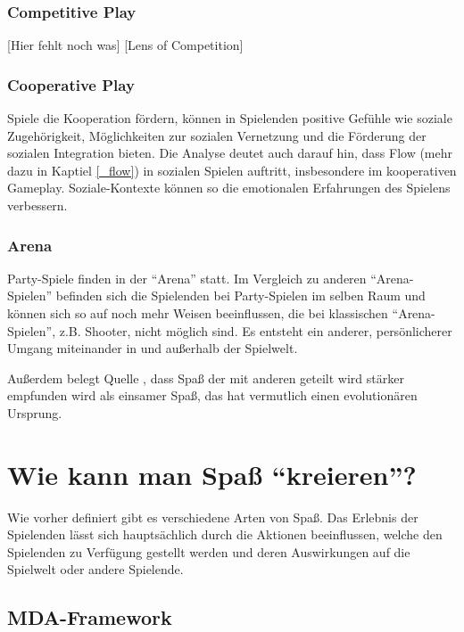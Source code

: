 \subsubsection{Competitive Play}
[Hier fehlt noch was]
[Lens of Competition]

\subsubsection{Cooperative Play\label{_cooperative_play}}
Spiele die Kooperation fördern, können in Spielenden positive Gefühle wie soziale Zugehörigkeit, Möglichkeiten zur sozialen Vernetzung und die Förderung der sozialen Integration bieten\cite{_putting_the_fun_factor_into_gaming}. Die Analyse deutet auch darauf hin, dass Flow (mehr dazu in Kaptiel \ref{_flow}) in sozialen Spielen auftritt, insbesondere im kooperativen Gameplay\cite{_putting_the_fun_factor_into_gaming}. Soziale-Kontexte können so die emotionalen Erfahrungen des Spielens verbessern.

\subsubsection{Arena}
Party-Spiele finden in der "`Arena"' statt\cite[S. 65]{_art_of_gamedesign}. Im Vergleich zu anderen "`Arena-Spielen"' befinden sich die Spielenden bei Party-Spielen im selben Raum und können sich so auf noch mehr Weisen beeinflussen, die bei klassischen "`Arena-Spielen"', z.B. Shooter, nicht möglich sind. Es entsteht ein anderer, persönlicherer Umgang miteinander in und außerhalb der Spielwelt.\newline

\noindent Außerdem belegt Quelle \cite{_fun_is_more_fun}, dass Spaß der mit anderen geteilt wird stärker empfunden wird als einsamer Spaß, das hat vermutlich einen evolutionären Ursprung.

\section{Wie kann man Spaß "`kreieren"'?}

Wie vorher definiert gibt es verschiedene Arten von Spaß. Das Erlebnis der Spielenden lässt sich hauptsächlich durch die Aktionen beeinflussen, welche den Spielenden zu Verfügung gestellt werden und deren Auswirkungen auf die Spielwelt oder andere Spielende.

\subsection{MDA-Framework}

